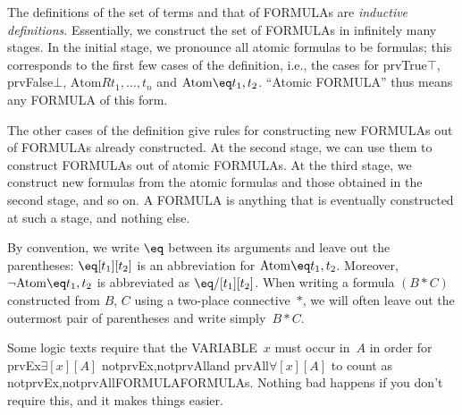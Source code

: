 \documentclass[10pt,a4paper]{article}
\newcommand*{\olup}[1]{\MakeUppercase{#1}}
\theoremstyle{plain}
\theoremstyle{definition}
\theoremstyle{remark}
\newenvironment{explain}{}{}
\providecommand{\lforall}{\mathord{\forall}}
\providecommand{\lexists}{\mathord{\exists}}
\providecommand{\ltrue}{\top}
\providecommand{\lfalse}{\bot}
\providecommand{\iftag}[1]{#1}
\providecommand{\Atom}{\mathrm{Atom}}
\providecommand{\iftag}{}
\begin{document}
\begin{explain}
The definitions of the set of terms and that of \olup{formula}s are
\emph{inductive definitions}.  Essentially, we construct the set of
\olup{formula}s in infinitely many stages.  In the initial stage, we
pronounce all atomic formulas to be formulas; this corresponds to the
first few cases of the definition, i.e., the cases for
\iftag{prvTrue}{$\ltrue$, }{}%
\iftag{prvFalse}{$\lfalse$, }{}%
$\Atom{R}{t_1,\dots,t_n}$ and $\Atom{\eq}{t_1,t_2}$. ``Atomic
\olup{formula}'' thus means any \olup{formula} of this form.

The other cases of the definition give rules for constructing new
\olup{formula}s out of \olup{formula}s already constructed.  At the second
stage, we can use them to construct \olup{formula}s out of atomic
\olup{formula}s.  At the third stage, we construct new formulas from the
atomic formulas and those obtained in the second stage, and so on.  A
\olup{formula} is anything that is eventually constructed at such a
stage, and nothing else.
\end{explain}

By convention, we write $\eq$ between its arguments and leave out the
parentheses: $\eq[t_1][t_2]$ is an abbreviation for
$\Atom{\eq}{t_1,t_2}$.  Moreover, $\lnot \Atom{\eq}{t_1,t_2}$ is
abbreviated as $\eq/[t_1][t_2]$. When writing a formula $(B \ast C)$
constructed from $B$, $C$ using a two-place connective~$\ast$, we
will often leave out the outermost pair of parentheses and write
simply~$B \ast C$.

\begin{intro}
Some logic texts require that the \olup{variable}~$x$ must occur in~$A$
in order for
\iftag{prvEx}{$\lexists[x][A]$ }{}%
\iftag{notprvEx,notprvAll}{}{and }%
\iftag{prvAll}{$\lforall[x][A]$ }{}%
to count as
\iftag{notprvEx,notprvAll}{\olup{formula}}{\olup{formula}s}.
Nothing bad happens if you don't require this, and it makes things
easier.
\end{intro}
\end{document}
